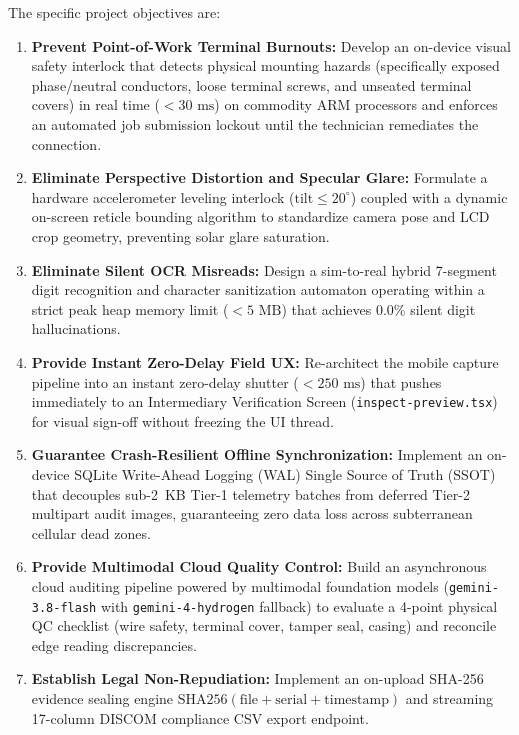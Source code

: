 \documentclass[12pt,a4paper,oneside]{report}
\begin{document}
The specific project objectives are:
\begin{enumerate}
    \item \textbf{Prevent Point-of-Work Terminal Burnouts:} Develop an on-device visual safety interlock that detects physical mounting hazards (specifically exposed phase/neutral conductors, loose terminal screws, and unseated terminal covers) in real time ($<30\text{~ms}$) on commodity ARM processors and enforces an automated job submission lockout until the technician remediates the connection.
    \item \textbf{Eliminate Perspective Distortion and Specular Glare:} Formulate a hardware accelerometer leveling interlock ($\text{tilt} \le 20^\circ$) coupled with a dynamic on-screen reticle bounding algorithm to standardize camera pose and LCD crop geometry, preventing solar glare saturation.
    \item \textbf{Eliminate Silent OCR Misreads:} Design a sim-to-real hybrid 7-segment digit recognition and character sanitization automaton operating within a strict peak heap memory limit ($<5\text{~MB}$) that achieves 0.0\% silent digit hallucinations.
    \item \textbf{Provide Instant Zero-Delay Field UX:} Re-architect the mobile capture pipeline into an instant zero-delay shutter ($<250\text{~ms}$) that pushes immediately to an Intermediary Verification Screen (\texttt{inspect-preview.tsx}) for visual sign-off without freezing the UI thread.
    \item \textbf{Guarantee Crash-Resilient Offline Synchronization:} Implement an on-device SQLite Write-Ahead Logging (WAL) Single Source of Truth (SSOT) that decouples sub-2~KB Tier-1 telemetry batches from deferred Tier-2 multipart audit images, guaranteeing zero data loss across subterranean cellular dead zones.
    \item \textbf{Provide Multimodal Cloud Quality Control:} Build an asynchronous cloud auditing pipeline powered by multimodal foundation models (\texttt{gemini-3.8-flash} with \texttt{gemini-4-hydrogen} fallback) to evaluate a 4-point physical QC checklist (wire safety, terminal cover, tamper seal, casing) and reconcile edge reading discrepancies.
    \item \textbf{Establish Legal Non-Repudiation:} Implement an on-upload SHA-256 evidence sealing engine $\text{SHA256}(\text{file} + \text{serial} + \text{timestamp})$ and streaming 17-column DISCOM compliance CSV export endpoint.
\end{enumerate}
\end{document}
